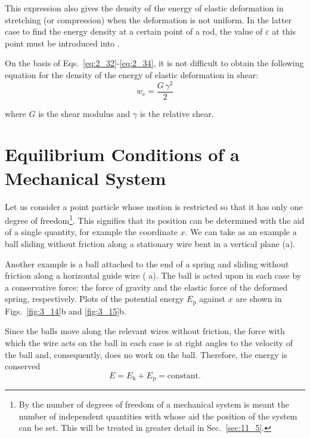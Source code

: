 \noindent
This expression also gives the density of the energy of elastic deformation in stretching (or compression) when the deformation is not uniform. In the latter case to find the energy density at a certain point of a rod, the value of $\varepsilon$ at this point must be introduced into .

On the basis of Eqs.~\eqref{eq:2_32}-\eqref{eq:2_34}, it is not difficult to obtain the following equation for the density of the energy of elastic deformation in shear:
\begin{equation}\label{eq:3_82}
w_{\text{e}} = \frac{G\,\gamma^2}{2}
\end{equation}

\noindent
where $G$ is the shear modulus and $\gamma$ is the relative shear.

\section{Equilibrium Conditions of a Mechanical System}\label{sec:3_9}

Let us consider a point particle whose motion is restricted so that it has only one degree of freedom\footnote{By the number of degrees of freedom of a mechanical system is meant the number of independent quantities with whose aid the position of the system can be set. This will be treated in greater detail in Sec.~\ref{sec:11_5}.}. This signifies that its position can be determined with the aid of a single quantity, for example the coordinate $x$. We can take as an example a ball sliding without friction along a stationary wire bent in a vertical plane (a).

Another example is a ball attached to the end of a spring and sliding without friction along a horizontal guide wire ( a). The ball is acted upon in each case by a conservative force: the force of gravity and the elastic force of the deformed spring, respectively. Plots of the potential energy $E_{\text{p}}$ against $x$ are shown in Figs.~\ref{fig:3_14}b and \ref{fig:3_15}b.

Since the balls move along the relevant wires without friction, the force with which the wire acts on the ball in each case is at right angles to the velocity of the ball and, consequently, does no work on the ball. Therefore, the energy is conserved
\begin{equation}\label{eq:3_83}
E = E_{\text{k}} + E_{\text{p}} = \text{constant}.
\end{equation}

